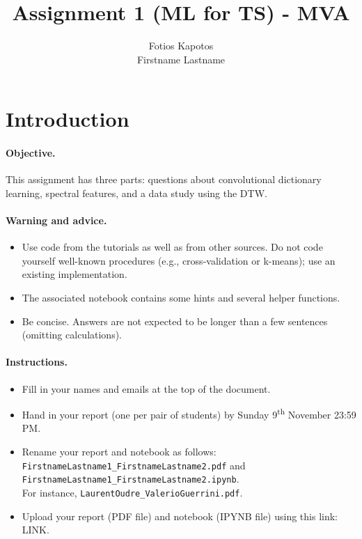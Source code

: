 \documentclass[11pt]{article}
\title{Assignment 1 (ML for TS) - MVA}
\author{
Fotios Kapotos \email{fotiskapotos@gmail.com} \\ %
Firstname Lastname \email{youremail2@mail.com} %
}
\begin{document}
\maketitle

\section{Introduction}

\paragraph{Objective.} This assignment has three parts: questions about convolutional dictionary learning, spectral features, and a data study using the DTW. 

\paragraph{Warning and advice.} 
\begin{itemize}
    \item Use code from the tutorials as well as from other sources. Do not code yourself well-known procedures (e.g., cross-validation or k-means); use an existing implementation. 
    \item The associated notebook contains some hints and several helper functions.
    \item Be concise. Answers are not expected to be longer than a few sentences (omitting calculations).
\end{itemize}



\paragraph{Instructions.}
\begin{itemize}
    \item Fill in your names and emails at the top of the document.
    \item Hand in your report (one per pair of students) by Sunday 9\textsuperscript{th} November 23:59 PM.
    \item Rename your report and notebook as follows:\\ \texttt{FirstnameLastname1\_FirstnameLastname2.pdf} and\\ \texttt{FirstnameLastname1\_FirstnameLastname2.ipynb}.\\
    For instance, \texttt{LaurentOudre\_ValerioGuerrini.pdf}.
    \item Upload your report (PDF file) and notebook (IPYNB file) using this link: \footnotesize{LINK}.
\end{itemize}
\end{document}
